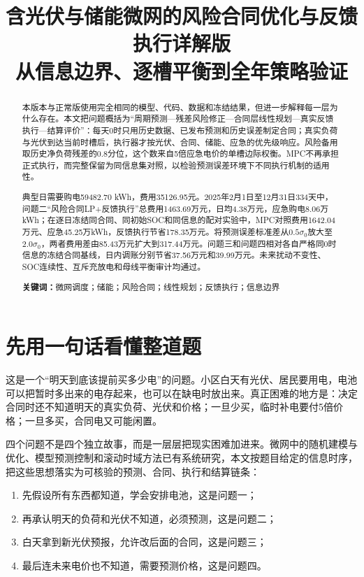 \documentclass[UTF8,fontset=fandol,a4paper,11pt]{ctexart}
\title{含光伏与储能微网的风险合同优化与反馈执行详解版\\\large 从信息边界、逐槽平衡到全年策略验证}
\author{}
\date{}
\newcommand{\keywords}[1]{\par\noindent\textbf{关键词：}#1}
\begin{document}
\maketitle
\thispagestyle{empty}
\begin{abstract}
本版本与正常版使用完全相同的模型、代码、数据和冻结结果，但进一步解释每一层为什么存在。本文把问题概括为“周期预测—残差风险修正—合同层线性规划—真实反馈执行—结算评价”：每天0时只用历史数据、已发布预测和历史误差制定合同；真实负荷与光伏到达当前时槽后，执行器才按光伏、合同、储能、应急的优先级响应。风险备用取历史净负荷残差的0.8分位，这个数来自5倍应急电价的单槽边际权衡。MPC不再承担正式执行，而完整保留为同信息集对照，以检验预测误差环境下不同执行机制的适用性。

典型日需要购电59482.70 kWh，费用35126.95元。2025年2月1日至12月31日334天中，问题二“风险合同LP+反馈执行”总费用1463.69万元，日均4.38万元，应急购电8.06万kWh；在逐日冻结同合同、同初始SOC和同信息的配对实验中，MPC对照费用1642.04万元、应急45.25万kWh，反馈执行节省178.35万元。将预测误差标准差从\(0.5\sigma_0\)放大至\(2.0\sigma_0\)，两者费用差由85.43万元扩大到317.44万元。问题三和问题四相对各自严格同0时信息的冻结合同基线，日内调账分别节省37.56万元和39.99万元。未来扰动不变性、SOC连续性、互斥充放电和母线平衡审计均通过。

\keywords{微网调度；储能；风险合同；线性规划；反馈执行；信息边界}
\end{abstract}

\newpage
\section{先用一句话看懂整道题}

这是一个“明天到底该提前买多少电”的问题。小区白天有光伏、居民要用电，电池可以把暂时多出来的电存起来，也可以在缺电时放出来。真正困难的地方是：决定合同时还不知道明天的真实负荷、光伏和价格；一旦少买，临时补电要付5倍价格；一旦多买，合同电又可能闲置。

四个问题不是四个独立故事，而是一层层把现实困难加进来。微网中的随机建模与优化、模型预测控制和滚动时域方法已有系统研究\cite{liang2014,hu2021,silvente2015}，本文按题目给定的信息时序，把这些思想落实为可核验的预测、合同、执行和结算链条：
\begin{enumerate}[label=第\arabic*步：]
  \item 先假设所有东西都知道，学会安排电池，这是问题一；
  \item 再承认明天的负荷和光伏不知道，必须预测，这是问题二；
  \item 白天拿到新光伏预报，允许改后面的合同，这是问题三；
  \item 最后连未来电价也不知道，需要预测价格，这是问题四。
\end{enumerate}
\end{document}
